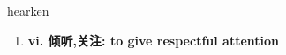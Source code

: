 
\begin{frame}
{\huge hearken}
\begin{center}
\begin{enumerate}\Large
  \item \textbf{vi. 倾听,关注: to give respectful attention}
\end{enumerate}
\end{center}
\end{frame}
